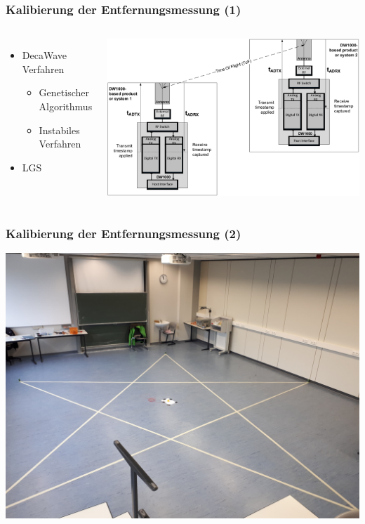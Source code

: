 \documentclass{beamer}
\begin{document}
%
% 
%
\begin{frame}
	\frametitle{Kalibierung der Entfernungsmessung (1)}
	\begin{columns}
		\begin{itemize}
			\item DecaWave Verfahren
			\begin{itemize}
				\item Genetischer Algorithmus
				\item Instabiles Verfahren
			\end{itemize}
			
			\item LGS
		\end{itemize}
		
			\includegraphics[scale=0.09]{decawave2014calibration_fig1}
	\end{columns}
\end{frame}


%
% 
%
\begin{frame}
	\frametitle{Kalibierung der Entfernungsmessung (2)}
	\centering
	\includegraphics[scale=0.06]{calibration_pentagram}
\end{frame}
\end{document}
